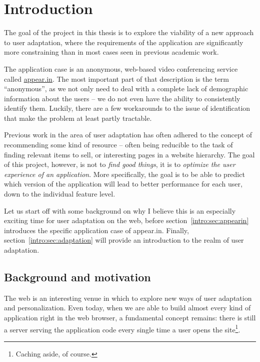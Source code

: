 \chapter{Introduction}

\label{Chapter1}



The goal of the project in this thesis is to explore the viability of a new approach to user adaptation, where the requirements of the application are significantly more constraining than in most cases seen in previous academic work.

The application case is an anonymous, web-based video conferencing service called \url{appear.in}. The most important part of that description is the term ``anonymous'', as we not only need to deal with a complete lack of demographic information about the users -- we do not even have the ability to consistently identify them. Luckily, there are a few workarounds to the issue of identification that make the problem at least partly tractable.

Previous work in the area of user adaptation has often adhered to the concept of recommending some kind of resource -- often being reducible to the task of finding relevant items to sell, or interesting pages in a website hierarchy. The goal of this project, however, is not to \emph{find good things}, it is to \emph{optimize the user experience of an application}. More specifically, the goal is to be able to predict which version of the application will lead to better performance for each user, down to the individual feature level.

Let us start off with some background on why I believe this is an especially exciting time for user adaptation on the web, before section~\ref{intro:sec:appearin} introduces the specific application case of appear.in. Finally, section~\ref{intro:sec:adaptation} will provide an introduction to the realm of user adaptation.

\section{Background and motivation}
\label{intro:sec:motivation}

The web is an interesting venue in which to explore new ways of user adaptation and personalization. Even today, when we are able to build almost every kind of application right in the web browser, a fundamental concept remains: there is still a server serving the application code every single time a user opens the site\footnote{Caching aside, of course.}.

